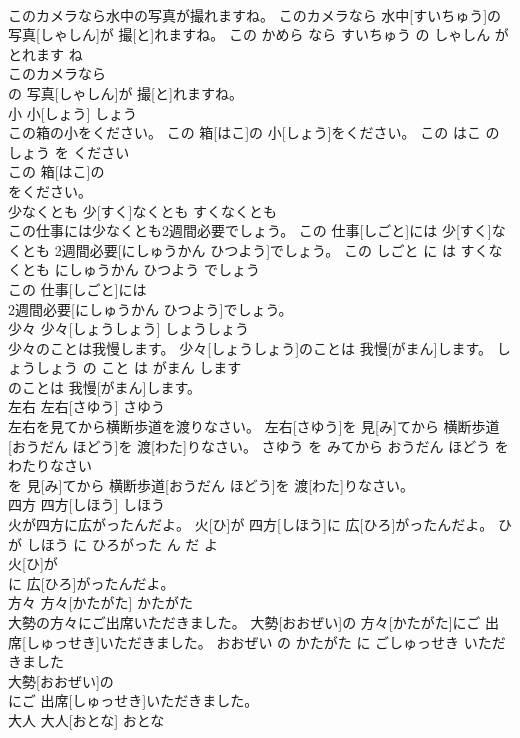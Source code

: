 \documentclass[8pt]{extreport}
\begin{document}
\begin{CJK}{UTF8}{min}
\\	このカメラなら水中の写真が撮れますね。	このカメラなら 水中[すいちゅう]の 写真[しゃしん]が 撮[と]れますね。	この かめら なら すいちゅう の しゃしん が とれます ね	
\\	このカメラなら
\\	の 写真[しゃしん]が 撮[と]れますね。			
\\	小	小[しょう]	しょう	
\\	この箱の小をください。	この 箱[はこ]の 小[しょう]をください。	この はこ の しょう を ください	
\\	この 箱[はこ]の
\\	をください。			
\\	少なくとも	少[すく]なくとも	すくなくとも	
\\	この仕事には少なくとも2週間必要でしょう。	この 仕事[しごと]には 少[すく]なくとも 2週間必要[にしゅうかん ひつよう]でしょう。	この しごと に は すくなくとも にしゅうかん ひつよう でしょう	
\\	この 仕事[しごと]には
\\	2週間必要[にしゅうかん ひつよう]でしょう。			
\\	少々	少々[しょうしょう]	しょうしょう	
\\	少々のことは我慢します。	少々[しょうしょう]のことは 我慢[がまん]します。	しょうしょう の こと は がまん します	
\\	のことは 我慢[がまん]します。			
\\	左右	左右[さゆう]	さゆう	
\\	左右を見てから横断歩道を渡りなさい。	左右[さゆう]を 見[み]てから 横断歩道[おうだん ほどう]を 渡[わた]りなさい。	さゆう を みてから おうだん ほどう を わたりなさい	
\\	を 見[み]てから 横断歩道[おうだん ほどう]を 渡[わた]りなさい。			
\\	四方	四方[しほう]	しほう	
\\	火が四方に広がったんだよ。	火[ひ]が 四方[しほう]に 広[ひろ]がったんだよ。	ひ が しほう に ひろがった ん だ よ	
\\	火[ひ]が
\\	に 広[ひろ]がったんだよ。			
\\	方々	方々[かたがた]	かたがた	
\\	大勢の方々にご出席いただきました。	大勢[おおぜい]の 方々[かたがた]にご 出席[しゅっせき]いただきました。	おおぜい の かたがた に ごしゅっせき いただきました	
\\	大勢[おおぜい]の
\\	にご 出席[しゅっせき]いただきました。			
\\	大人	大人[おとな]	おとな	

\end{CJK}
\end{document}
